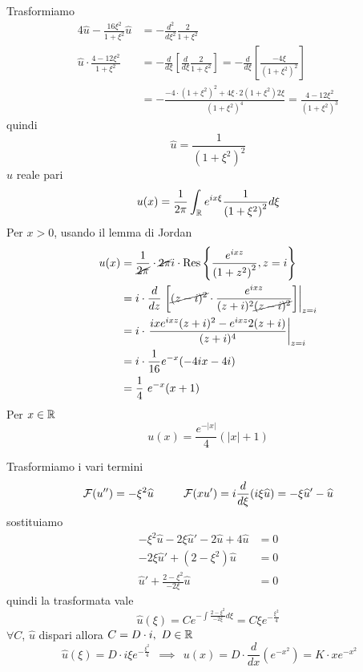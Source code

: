 Trasformiamo
\begin{align*}
4\hat{u} - \frac{16\xi^{2}}{1 + \xi^{2}}\hat{u} & = - \frac{d^{2}}{d\xi^{2}}\frac{2}{1 + \xi^{2}}\\
\hat{u} \cdot \frac{4 - 12\xi^{2}}{1 + \xi^{2}} & = - \frac{d}{d\xi}\left[\frac{d}{d\xi}\frac{2}{1 + \xi^{2}}\right] = - \frac{d}{d\xi}\left[\frac{- 4\xi}{\left(1 + \xi^{2}\right)^{2}}\right]\\
 & = - \frac{- 4 \cdot \left(1 + \xi^{2}\right)^{2} + 4\xi \cdot 2\left(1 + \xi^{2}\right) 2\xi}{\left(1 + \xi^{2}\right)^{4}} = \frac{4 - 12\xi^{2}}{\left(1 + \xi^{2}\right)^{3}}
\end{align*}
quindi
\begin{equation*}
\hat{u} = \frac{1}{\left(1 + \xi^{2}\right)^{2}}
\end{equation*}
$\hat{u}$ reale pari
\begin{equation*}
u(x) = \frac{1}{2\pi}\int_{\mathbb{R}} e^{ix\xi}\frac{1}{\left(1 + \xi^{2}\right)^{2}} d\xi 
\end{equation*}
Per $x > 0$, usando il lemma di Jordan
\begin{align*}
u(x) & = \frac{1}{\cancel{2\pi}} \cdot \cancel{2\pi} i \cdot \operatorname{Res} \left\{\frac{e^{ixz}}{\left(1 + z^{2}\right)^{2}}, z = i\right\}\\
 & = i \cdot \frac{d}{dz}\left. \left[\cancel{(z - i)^{2}} \cdot \frac{e^{ixz}}{(z + i)^{2}\cancel{(z - i)^{2}}}\right]\right|_{z = i}\\
 & = i \cdot \left. \frac{ixe^{ixz}(z + i)^{2} - e^{ixz} 2(z + i)}{(z + i)^{4}}\right|_{z = i}\\
 & = i \cdot \frac{1}{16} e^{- x}(- 4ix - 4i)\\
 & = \frac{1}{4} \ e^{- x}(x + 1)
\end{align*}
Per $x\in \mathbb{R} $
\begin{equation*}
u(x) = \frac{e^{- | x|}}{4}(| x| + 1)
\end{equation*}
\Soluzione

Trasformiamo i vari termini
\begin{equation*}
\mathcal{F} (u'') = - \xi^{2}\widehat{u} \ \ \ \ \ \ \ \ \mathcal{F} (xu') = i\frac{d}{d\xi}(i\xi \widehat{u}) = - \xi \widehat{u} ' - \widehat{u}
\end{equation*}
sostituiamo
\begin{align*}
- \xi^{2}\hat{u} - 2\xi \hat{u} ' - 2\hat{u} + 4\hat{u} & = 0\\
- 2\xi \hat{u} ' + \left(2 - \xi^{2}\right)\hat{u} & = 0\\
\hat{u} ' + \frac{2 - \xi^{2}}{- 2\xi}\hat{u} & = 0
\end{align*}
quindi la trasformata vale
\begin{equation*}
\hat{u}(\xi) = Ce^{- \int \frac{2 - \xi^{2}}{- 2\xi} d\xi} = C\xi e^{- \frac{\xi^{2}}{4}}
\end{equation*}
$\forall C$, $\hat{u}$ dispari allora $C = D \cdot i, \ D\in \mathbb{R} $
\begin{equation*}
\ \hat{u}(\xi) = D \cdot i\xi e^{- \frac{\xi^{2}}{4}} \ \ \implies \ \ u(x) = D \cdot \frac{d}{dx}\left(e^{- x^{2}}\right) = K \cdot xe^{- x^{2}}
\end{equation*}
